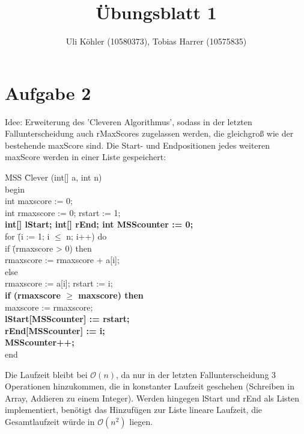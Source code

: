 \documentclass[a4paper,10pt]{article}
\title{Übungsblatt 1}
\author{Uli Köhler (10580373), Tobias Harrer (10575835)}
\begin{document}
\maketitle

\section{Aufgabe 2}
Idee: Erweiterung des 'Cleveren Algorithmus', sodass in der letzten Fallunterscheidung auch rMaxScores zugelassen werden,
die gleichgroß wie der bestehende maxScore sind. Die Start- und Endpositionen jedes weiteren maxScore werden in einer Liste gespeichert:
\newline
\begin{tabbing}
MSS \= Clever (int[] a, int n)\\
begin\\
\>int maxscore   := 0;\\
\>int rmaxscore  := 0; rstart := 1;\\
\>\textbf{int[] lStart; int[] rEnd; int MSScounter := 0;}\\
\>for \= (i := 1; i $\leq$ n; i++) do\\
\> \>if \=(rmaxscore > 0) then\\
\> \> \>rmaxscore := rmaxscore + a[i];\\
\> \> else \= \\
\> \> \>rmaxscore := a[i]; rstart := i;\\
\> \>\textbf{if (rmaxscore $\geq$ maxscore) then}\\
\> \> \> maxscore := rmaxscore; \\ \> \> \> \textbf{lStart[MSScounter] := rstart;}\\ \> \> \> \textbf{rEnd[MSScounter] := i;}\\
\> \> \>  \textbf{MSScounter++;}\\
end
\end{tabbing}
Die Laufzeit bleibt bei $\mathcal{O}(n)$, da nur in der letzten Fallunterscheidung 3 Operationen
hinzukommen, die in konstanter Laufzeit geschehen (Schreiben in Array, Addieren zu einem Integer). Werden hingegen lStart und rEnd
als Listen implementiert, benötigt das Hinzufügen zur Liste lineare Laufzeit, die Gesamtlaufzeit würde in $\mathcal{O}(n^2)$ liegen.
\end{document}
